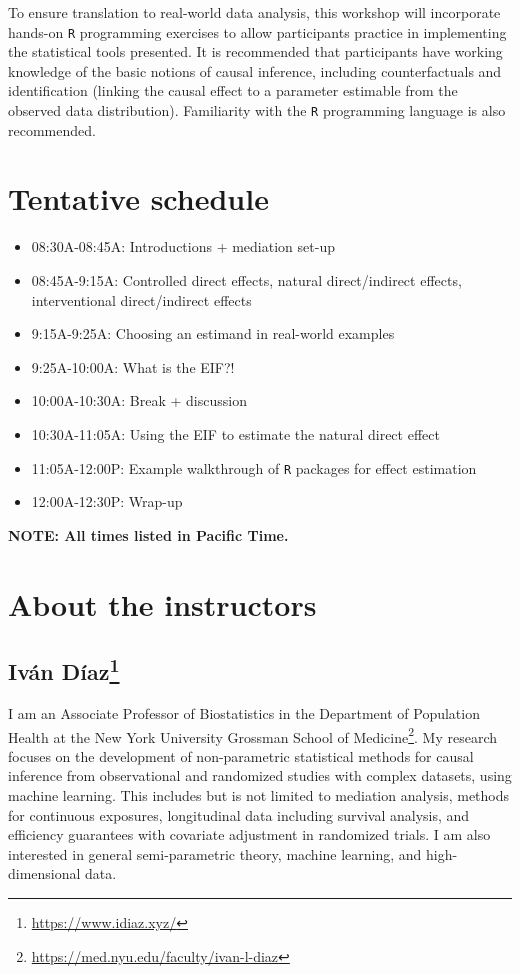 \documentclass[
  12pt,
]{book}
\newcommand{\passthrough}[1]{#1}
\providecommand{\tightlist}{%
  \setlength{\itemsep}{0pt}\setlength{\parskip}{0pt}}
\renewcommand{\href}[2]{#2\footnote{\url{#1}}}
\theoremstyle{definition}
\theoremstyle{definition}
\theoremstyle{definition}
\newcommand{\1}{\mathbbm{1}}
\begin{document}
To ensure translation to real-world data analysis, this workshop will
incorporate hands-on \passthrough{\lstinline!R!} programming exercises to allow participants practice in
implementing the statistical tools presented. It is recommended that
participants have working knowledge of the basic notions of causal inference,
including counterfactuals and identification (linking the causal effect to a
parameter estimable from the observed data distribution). Familiarity with the
\passthrough{\lstinline!R!} programming language is also recommended.

\hypertarget{schedule}{%
\section{Tentative schedule}\label{schedule}}

\begin{itemize}
\tightlist
\item
  08:30A-08:45A: Introductions + mediation set-up
\item
  08:45A-9:15A: Controlled direct effects, natural direct/indirect effects,
  interventional direct/indirect effects
\item
  9:15A-9:25A: Choosing an estimand in real-world examples
\item
  9:25A-10:00A: What is the EIF?!
\item
  10:00A-10:30A: Break + discussion
\item
  10:30A-11:05A: Using the EIF to estimate the natural direct effect
\item
  11:05A-12:00P: Example walkthrough of \passthrough{\lstinline!R!} packages for effect estimation
\item
  12:00A-12:30P: Wrap-up
\end{itemize}

\textbf{NOTE: All times listed in Pacific Time.}

\hypertarget{instructors}{%
\section{About the instructors}\label{instructors}}

\hypertarget{ivuxe1n-duxedaz}{%
\subsection*{\texorpdfstring{\href{https://www.idiaz.xyz/}{Iván Díaz}}{Iván Díaz}}\label{ivuxe1n-duxedaz}}


I am an Associate Professor of Biostatistics in the \href{https://med.nyu.edu/faculty/ivan-l-diaz}{Department of Population
Health at the New York University Grossman School of
Medicine}. My research focuses on the
development of non-parametric statistical methods for causal inference from
observational and randomized studies with complex datasets, using machine
learning. This includes but is not limited to mediation analysis, methods for
continuous exposures, longitudinal data including survival analysis, and
efficiency guarantees with covariate adjustment in randomized trials. I am also
interested in general semi-parametric theory, machine learning, and
high-dimensional data.
\end{document}
